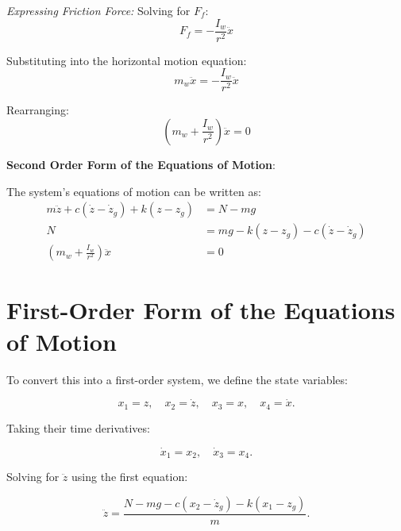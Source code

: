 \documentclass[12pt,letterpaper, onecolumn]{exam}
\begin{document}
\begin{questions}
\begin{solution}
\begin{parts}
    \textit{Expressing Friction Force:}
    Solving for $F_f$:
    \begin{equation}
    F_f = -\frac{I_w}{r^2} \ddot{x}
    \end{equation}

    Substituting into the horizontal motion equation:
    \begin{equation}
    m_w \ddot{x} = -\frac{I_w}{r^2} \ddot{x}
    \end{equation}

    Rearranging:
    \begin{equation}
    \left( m_w + \frac{I_w}{r^2} \right) \ddot{x} = 0
    \end{equation}

    \textbf{Second Order Form of the Equations of Motion}:

    \vspace{5mm}
    The system's equations of motion can be written as:
    \begin{align}
    m\ddot{z} + c(\dot{z} - \dot{z}_g) + k(z - z_g) &= N - mg \\
    N &= mg - k(z - z_g) - c(\dot{z} - \dot{z}_g) \\
    \left( m_w + \frac{I_w}{r^2} \right) \ddot{x} &= 0
    \end{align}

    \section*{First-Order Form of the Equations of Motion}
    
To convert this into a first-order system, we define the state variables:

\begin{equation}
    x_1 = z, \quad x_2 = \dot{z}, \quad x_3 = x, \quad x_4 = \dot{x}.
\end{equation}

\pagebreak

Taking their time derivatives:

\begin{equation}
    \dot{x}_1 = x_2, \quad \dot{x}_3 = x_4.
\end{equation}

Solving for \( \ddot{z} \) using the first equation:

\begin{equation}
    \ddot{z} = \frac{N - mg - c(x_2 - \dot{z}_g) - k(x_1 - z_g)}{m}.
\end{equation}


\end{parts}
\end{solution}
\end{questions}
\end{document}

